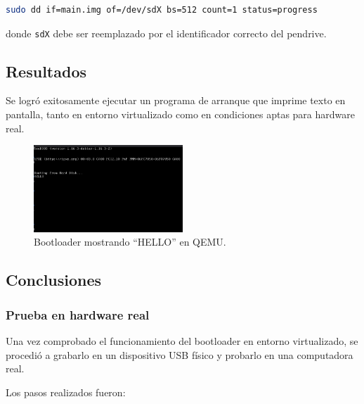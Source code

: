 \begin{lstlisting}[language=bash, caption={Grabación en dispositivo USB}]
sudo dd if=main.img of=/dev/sdX bs=512 count=1 status=progress
\end{lstlisting}

donde \texttt{sdX} debe ser reemplazado por el identificador correcto del pendrive.

\subsection{Resultados}

Se logró exitosamente ejecutar un programa de arranque que imprime texto en pantalla, tanto en entorno virtualizado como en condiciones aptas para hardware real.

\begin{figure}[H]
    \centering
    \includegraphics[width=0.5\textwidth]{images/bootloader_hello.png}
    \caption{Bootloader mostrando ``HELLO'' en QEMU.}
\end{figure}

\subsection{Conclusiones}

\subsubsection{Prueba en hardware real}

Una vez comprobado el funcionamiento del bootloader en entorno virtualizado, se procedió a grabarlo en un dispositivo USB físico y probarlo en una computadora real.

Los pasos realizados fueron:

